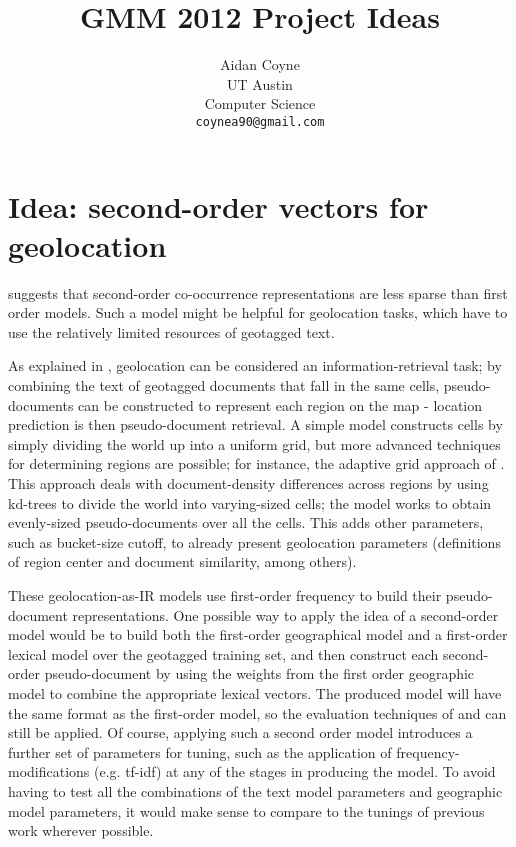 \documentclass[11pt]{article}
\title{GMM 2012 Project Ideas}
\author{Aidan Coyne \\
    UT Austin\\
    Computer Science\\
  {\tt coynea90@gmail.com} \\}
\date{}
\begin{document}
\maketitle

\section{Idea: second-order vectors for geolocation}
\cite{schutze98} suggests that second-order co-occurrence representations are
less sparse than first order models.
Such a model might be helpful for geolocation tasks, which have to use the
relatively limited resources of geotagged text.

As explained in \cite{skiles12}, geolocation can be considered an
information-retrieval task; by combining the text of geotagged documents that
fall in the same cells, pseudo-documents can be constructed to represent each
region on the map - location prediction is then pseudo-document retrieval.
A simple model constructs cells by simply dividing the world up into a uniform grid,
but more advanced techniques for determining regions are possible;
for instance, the adaptive grid approach of \cite{adaptivegrid}.
This approach deals with document-density differences across regions by using
kd-trees to divide the world into varying-sized cells; the model works to
obtain evenly-sized pseudo-documents over all the cells. This adds other
parameters, such as bucket-size cutoff, to already present geolocation
parameters (definitions of region center and document similarity, among others).

These geolocation-as-IR models use first-order frequency to build their
pseudo-document representations. One possible way to apply the idea of a
second-order model would be to build both the first-order geographical model
and a first-order lexical model over the geotagged training set, and then
construct each second-order pseudo-document by using the weights from the first
order geographic model to combine the appropriate lexical vectors. 
The produced model will have the same format as the first-order model, so the
evaluation techniques of \cite{skiles12} and \cite{adaptivegrid} can still be
applied.
Of course, applying such a second order model introduces a further set of
parameters for tuning, such as the application of frequency-modifications
(e.g. tf-idf) at any of the stages in producing the model.
To avoid having to test all the combinations of the text model parameters and
geographic model parameters, it would make sense to compare to the tunings of
previous work wherever possible.
\end{document}
